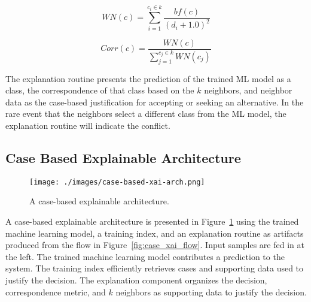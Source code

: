 \begin{equation}\label{eq:weight_of_neighbors}
    WN(c) = \sum_{i=1}^{c_i \in k} \frac{bf(c)}{(d_i+1.0)^2} 
\end{equation}

\begin{equation}\label{eq:correspondence}
    Corr(c) = \frac{WN(c)}{\sum_{j=1}^{c_j \in k}{WN(c_j)}} 
\end{equation}

The explanation routine presents the prediction of the trained ML model as a
class, the correspondence of that class based on the $k$ neighbors, and neighbor
data as the case-based justification for accepting or seeking an alternative. In
the rare event that the neighbors select a different class from the ML model,
the explanation routine will indicate the conflict.

\subsection{Case Based Explainable Architecture}

\begin{figure}[H]
    \centering
    \texttt{[image: ./images/case-based-xai-arch.png]}
    \caption{A case-based explainable architecture.}
    \label{fig:case_xai_arch}
\end{figure}

A case-based explainable architecture is presented in
Figure~\ref{fig:case_xai_arch} using the trained machine learning model, a
training index, and an explanation routine as artifacts produced from the flow
in Figure~\ref{fig:case_xai_flow}. Input samples are fed in at the left. The
trained machine learning model contributes a prediction to the system. The
training index efficiently retrieves cases and supporting data used to justify
the decision. The explanation component organizes the decision, correspondence
metric, and $k$ neighbors as supporting data to justify the decision.
